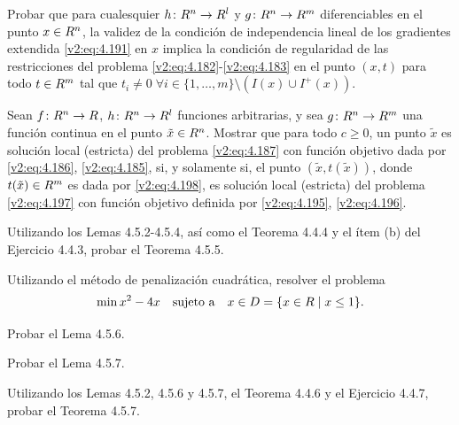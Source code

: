 \begin{exercise}\label{v2:ejer:4.5.8}
    Probar que para cualesquier $h \colon R^n \to R^l$ y $g \colon R^n \to R^m$ diferenciables en el punto $x \in R^n$, la validez de la condición de independencia lineal de los gradientes extendida \eqref{v2:eq:4.191} en $x$ implica la condición de regularidad de las restricciones del problema \eqref{v2:eq:4.182}-\eqref{v2:eq:4.183} en el punto $(x, t)$ para todo $t \in R^m$ tal que $t_i \neq 0 \; \forall i \in \{1, \dots, m\} \setminus (I(x) \cup I^+(x))$.
\end{exercise}

\begin{exercise}\label{v2:ejer:4.5.9}
    Sean $f \colon R^n \to R$, $h \colon R^n \to R^l$ funciones arbitrarias, y sea $g \colon R^n \to R^m$ una función continua en el punto $\tilde{x} \in R^n$. Mostrar que para todo $c \ge 0$, un punto $\tilde{x}$ es solución local (estricta) del problema \eqref{v2:eq:4.187} con función objetivo dada por \eqref{v2:eq:4.186}, \eqref{v2:eq:4.185}, si, y solamente si, el punto $(\tilde{x}, t(\tilde{x}))$, donde $t(\tilde{x}) \in R^m$ es dada por \eqref{v2:eq:4.198}, es solución local (estricta) del problema \eqref{v2:eq:4.197} con función objetivo definida por \eqref{v2:eq:4.195}, \eqref{v2:eq:4.196}.
\end{exercise}

\begin{exercise}\label{v2:ejer:4.5.10}
    Utilizando los Lemas 4.5.2-4.5.4, así como el Teorema 4.4.4 y el ítem (b) del Ejercicio 4.4.3, probar el Teorema 4.5.5.
\end{exercise}

\begin{exercise}\label{v2:ejer:4.5.11}
    Utilizando el método de penalización cuadrática, resolver el problema
    \[
        \min x^2 - 4x \quad \text{sujeto a} \quad x \in D = \{x \in R \mid x \le 1\}.
    \]
\end{exercise}

\begin{exercise}\label{v2:ejer:4.5.12}
    Probar el Lema 4.5.6.
\end{exercise}

\begin{exercise}\label{v2:ejer:4.5.13}
    Probar el Lema 4.5.7.
\end{exercise}

\begin{exercise}\label{v2:ejer:4.5.14}
    Utilizando los Lemas 4.5.2, 4.5.6 y 4.5.7, el Teorema 4.4.6 y el Ejercicio 4.4.7, probar el Teorema 4.5.7.
\end{exercise}

